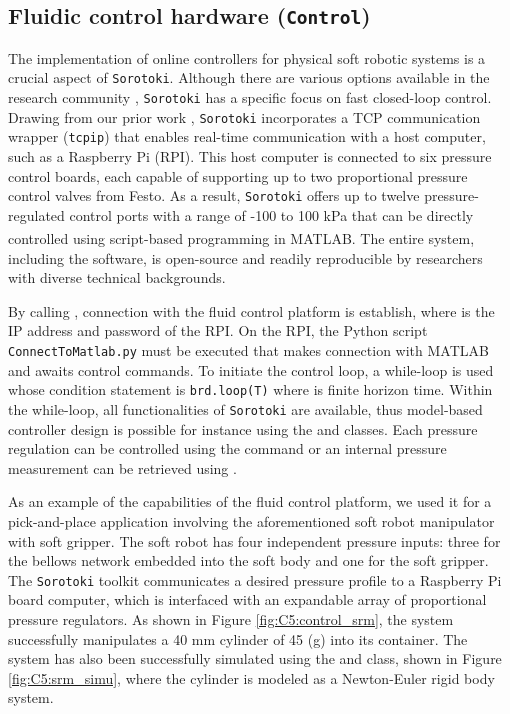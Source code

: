 
\subsection{Fluidic control hardware (\texttt{Control})}
\label{sec:C5:control}
The implementation of online controllers for physical soft robotic systems is a crucial aspect of \texttt{Sorotoki}. Although there are various options available in the research community \cite{Xavier2022Jun}, \texttt{Sorotoki} has a specific focus on fast closed-loop control. Drawing from our prior work \cite{Caasenbrood2022Apr}, \texttt{Sorotoki} incorporates a TCP communication wrapper (\texttt{tcpip}) that enables real-time communication with a host computer, such as a Raspberry Pi (RPI). This host computer is connected to six pressure control boards, each capable of supporting up to two proportional pressure control valves from Festo. As a result, \texttt{Sorotoki} offers up to twelve pressure-regulated control ports with a range of -100 to 100 kPa that can be directly controlled using script-based programming in MATLAB\textsuperscript{\scriptsize\textregistered}. The entire system, including the software, is open-source and readily reproducible by researchers with diverse technical backgrounds.

By calling , connection with the fluid control platform is establish, where  is the IP address and password of the RPI. On the RPI, the Python script \texttt{ConnectToMatlab.py} must be executed that makes connection with {MATLAB} and awaits control commands. To initiate the control loop, a while-loop is used whose condition statement is \texttt{brd.loop(T)} where  is finite horizon time. Within the while-loop, all functionalities of \texttt{Sorotoki} are available, thus model-based controller design is possible for instance using the  and  classes. Each pressure regulation can be controlled using the command  or an internal pressure measurement can be retrieved using . \\ \vspace{-5mm}

\begin{example}
As an example of the capabilities of the fluid control platform, we used it for a pick-and-place application involving the aforementioned soft robot manipulator with soft gripper. The soft robot has four independent pressure inputs: three for the bellows network embedded into the soft body and one for the soft gripper. The \texttt{Sorotoki} toolkit communicates a desired pressure profile to a Raspberry Pi board computer, which is interfaced with an expandable array of proportional pressure regulators. As shown in Figure \ref{fig:C5:control_srm}, the system successfully manipulates a 40 mm cylinder of 45 (g) into its container. The system has also been successfully simulated using the  and  class, shown in Figure \ref{fig:C5:srm_simu}, where the cylinder is modeled as a Newton-Euler rigid body system.
\end{example}

